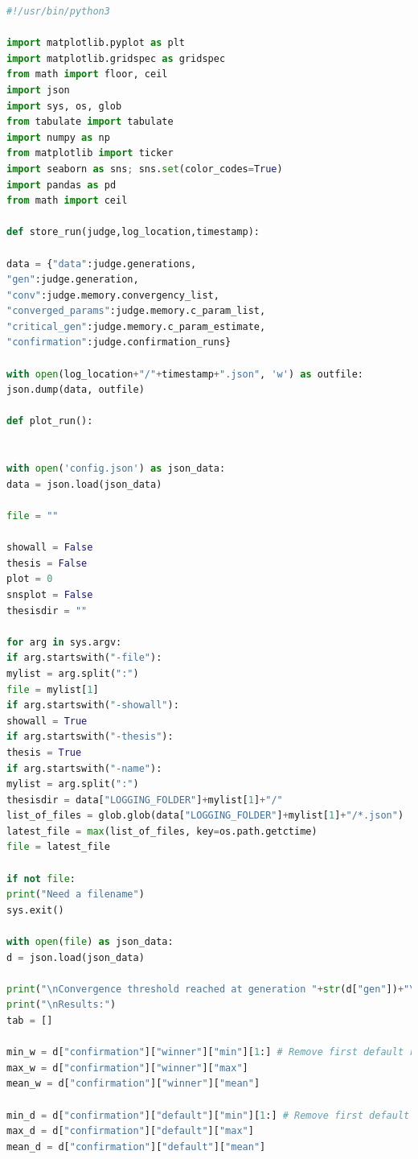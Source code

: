 \documentclass[a4paper,english]{report}
\begin{document}
\begin{lstlisting}[language=Python, caption=plotting.py\, easily allows for visualization of results.]
#!/usr/bin/python3

import matplotlib.pyplot as plt
import matplotlib.gridspec as gridspec
from math import floor, ceil
import json
import sys, os, glob
from tabulate import tabulate
import numpy as np
from matplotlib import ticker
import seaborn as sns; sns.set(color_codes=True)
import pandas as pd
from math import ceil

def store_run(judge,log_location,timestamp):

data = {"data":judge.generations,
"gen":judge.generation,
"conv":judge.memory.convergency_list,
"converged_params":judge.memory.c_param_list,
"critical_gen":judge.memory.c_param_estimate,
"confirmation":judge.confirmation_runs}

with open(log_location+"/"+timestamp+".json", 'w') as outfile:
json.dump(data, outfile)

def plot_run():


with open('config.json') as json_data:
data = json.load(json_data)

file = ""

showall = False
thesis = False
plot = 0
snsplot = False
thesisdir = ""

for arg in sys.argv:
if arg.startswith("-file"):
mylist = arg.split(":")
file = mylist[1]
if arg.startswith("-showall"):
showall = True
if arg.startswith("-thesis"):
thesis = True
if arg.startswith("-name"):
mylist = arg.split(":")
thesisdir = data["LOGGING_FOLDER"]+mylist[1]+"/"
list_of_files = glob.glob(data["LOGGING_FOLDER"]+mylist[1]+"/*.json")
latest_file = max(list_of_files, key=os.path.getctime)
file = latest_file

if not file:
print("Need a filename")
sys.exit()

with open(file) as json_data:
d = json.load(json_data)

print("\nConvergence threshold reached at generation "+str(d["gen"])+"\n")
print("\nResults:")
tab = []

min_w = d["confirmation"]["winner"]["min"][1:] # Remove first default run from calculations
max_w = d["confirmation"]["winner"]["max"]
mean_w = d["confirmation"]["winner"]["mean"]

min_d = d["confirmation"]["default"]["min"][1:] # Remove first default run from calculations
max_d = d["confirmation"]["default"]["max"]
mean_d = d["confirmation"]["default"]["mean"]


\end{lstlisting}
\end{document}
